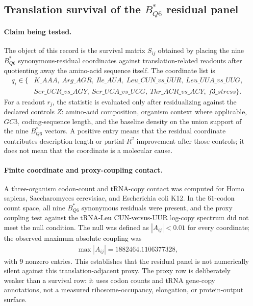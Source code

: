 \subsection{Translation survival of the $B^*_{Q6}$ residual panel}
\label{sec:translation-survival-b-star-q6-survival-matrix-translation-realization}

\paragraph{Claim being tested.}
The object of this record is the survival matrix $S_{ij}$ obtained by placing the nine $B^*_{Q6}$ synonymous-residual coordinates against translation-related readouts after quotienting away the amino-acid sequence itself.  The coordinate list is
$$
\begin{aligned}
q_i \in \{&K\_AAA,\ Arg\_AGR,\ Ile\_AUA,\ Leu\_CUN\_vs\_UUR,\ Leu\_UUA\_vs\_UUG,\\
&Ser\_UCR\_vs\_AGY,\ Ser\_UCA\_vs\_UCG,\ Thr\_ACR\_vs\_ACY,\ f3\_stress\}.
\end{aligned}
$$
For a readout $r_j$, the statistic is evaluated only after residualizing against the declared controls $Z$: amino-acid composition, organism context where applicable, $GC3$, coding-sequence length, and the baseline density on the union support of the nine $B^*_{Q6}$ vectors.  A positive entry means that the residual coordinate contributes description-length or partial-$R^2$ improvement after those controls; it does not mean that the coordinate is a molecular cause.

\paragraph{Finite coordinate and proxy-coupling contact.}
A three-organism codon-count and tRNA-copy contact was computed for Homo sapiens, Saccharomyces cerevisiae, and Escherichia coli K12.  In the $61$-codon count space, all nine $B^*_{Q6}$ synonymous residuals were present, and the proxy coupling test against the tRNA-Leu CUN-versus-UUR log-copy spectrum did not meet the null condition.  The null was defined as $|A_{ij}|<0.01$ for every coordinate; the observed maximum absolute coupling was
$$
\begin{aligned}
\max |A_{ij}| = 1882464.1106377328,
\end{aligned}
$$
with $9$ nonzero entries.  This establishes that the residual panel is not numerically silent against this translation-adjacent proxy.  The proxy row is deliberately weaker than a survival row: it uses codon counts and tRNA gene-copy annotations, not a measured ribosome-occupancy, elongation, or protein-output surface.

